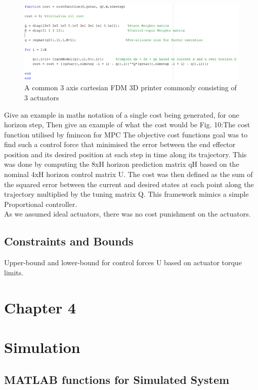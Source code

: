 \documentclass{UoNMCHA}
\numberwithin{equation}{section}
\begin{document}
	\begin{figure}[H]
		\begin{center}
			\includegraphics[width=.8\linewidth]{figs/Picture12}
			\caption{A  common 3 axis cartesian FDM 3D printer commonly consisting of 3 actuators}
			\label{figs/Picture12}
		\end{center}
	\end{figure}
	
	
	Give an example in maths notation of a single cost being generated, for one horizon step,
	Then give an example of what the cost would be 
	Fig. 10:The cost function utilised by fmincon for MPC
	The objective cost functions goal was to find such a control force that minimised the error between the end effector position and its desired position at each step in time along its trajectory. This was done by computing the 8xH horizon prediction matrix qH based on the nominal 4xH horizon control matrix U. The cost was then defined as the sum of the squared error between the current and desired states at each point along the trajectory multiplied by the tuning matrix Q. This framework mimics a simple Proportional controller. \\
	As we assumed ideal actuators, there was no cost punishment on the actuators.
	\subsection*{Constraints and Bounds}
	Upper-bound and lower-bound for control forces U based on actuator torque limits.
	
	
	\newpage
	\section*{Chapter 4}
	\section{Simulation}
	
	\subsection{MATLAB functions for Simulated System}
	
\end{document}
